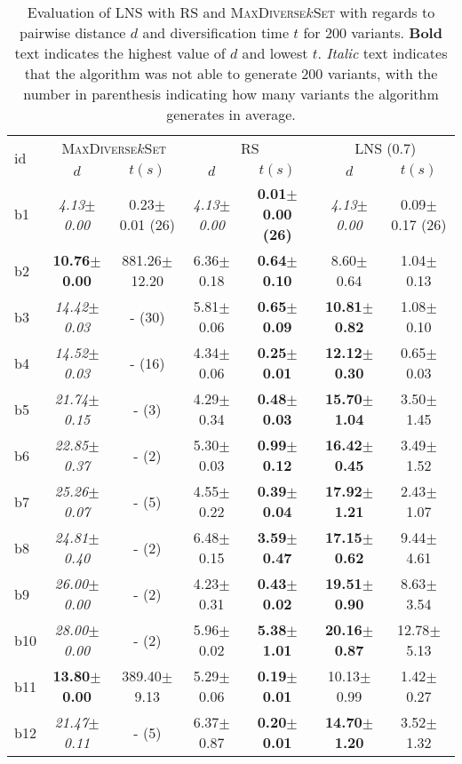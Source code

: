 \begin{longtable}{|l|c|c|c|c|c|c|}
\caption{\label{tab:dist_max_rs_lns} Evaluation of \ac{LNS} with \ac{RS} and \textsc{MaxDiverse$k$Set}
		with regards to pairwise distance $d$ and diversification time $t$ for 200 variants. \textbf{Bold} text indicates the highest value of $d$
		and lowest $t$. \textit{Italic} text indicates that the algorithm was not able to generate
		200 variants, with the number in parenthesis indicating how many variants the algorithm generates in average.}\\
\hline
\multirow{2}{*}{id}&\multicolumn{2}{c|}{\textsc{MaxDiverse$k$Set}}&\multicolumn{2}{c|}{{RS}}&\multicolumn{2}{c|}{LNS (0.7)}\\
\cline{2-7}
&$d$&$t(s)$&$d$&$t(s)$&$d$&$t(s)$\\
\hline
b1&\textit{4.13$\pm$0.00} & 0.23$\pm$0.01 (26)&\textit{4.13$\pm$0.00} & \textbf{0.01$\pm$0.00 (26)}&\textit{4.13$\pm$0.00} & 0.09$\pm$0.17 (26)
\\
b2&\textbf{10.76$\pm$0.00} & 881.26$\pm$12.20&6.36$\pm$0.18 & \textbf{0.64$\pm$0.10}&8.60$\pm$0.64 & 1.04$\pm$0.13
\\
b3&\textit{14.42$\pm$0.03} & - (30)&5.81$\pm$0.06 & \textbf{0.65$\pm$0.09}&\textbf{10.81$\pm$0.82} & 1.08$\pm$0.10
\\
b4&\textit{14.52$\pm$0.03} & - (16)&4.34$\pm$0.06 & \textbf{0.25$\pm$0.01}&\textbf{12.12$\pm$0.30} & 0.65$\pm$0.03
\\
b5&\textit{21.74$\pm$0.15} & - (3)&4.29$\pm$0.34 & \textbf{0.48$\pm$0.03}&\textbf{15.70$\pm$1.04} & 3.50$\pm$1.45
\\
b6&\textit{22.85$\pm$0.37} & - (2)&5.30$\pm$0.03 & \textbf{0.99$\pm$0.12}&\textbf{16.42$\pm$0.45} & 3.49$\pm$1.52
\\
b7&\textit{25.26$\pm$0.07} & - (5)&4.55$\pm$0.22 & \textbf{0.39$\pm$0.04}&\textbf{17.92$\pm$1.21} & 2.43$\pm$1.07
\\
b8&\textit{24.81$\pm$0.40} & - (2)&6.48$\pm$0.15 & \textbf{3.59$\pm$0.47}&\textbf{17.15$\pm$0.62} & 9.44$\pm$4.61
\\
b9&\textit{26.00$\pm$0.00} & - (2)&4.23$\pm$0.31 & \textbf{0.43$\pm$0.02}&\textbf{19.51$\pm$0.90} & 8.63$\pm$3.54
\\
b10&\textit{28.00$\pm$0.00} & - (2)&5.96$\pm$0.02 & \textbf{5.38$\pm$1.01}&\textbf{20.16$\pm$0.87} & 12.78$\pm$5.13
\\
b11&\textbf{13.80$\pm$0.00} & 389.40$\pm$9.13&5.29$\pm$0.06 & \textbf{0.19$\pm$0.01}&10.13$\pm$0.99 & 1.42$\pm$0.27
\\
b12&\textit{21.47$\pm$0.11} & - (5)&6.37$\pm$0.87 & \textbf{0.20$\pm$0.01}&\textbf{14.70$\pm$1.20} & 3.52$\pm$1.32

\end{longtable}
